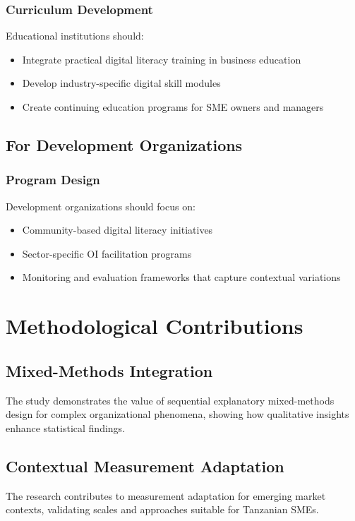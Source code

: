 \subsubsection{Curriculum Development}
Educational institutions should:
\begin{itemize}
    \item Integrate practical digital literacy training in business education
    \item Develop industry-specific digital skill modules
    \item Create continuing education programs for SME owners and managers
\end{itemize}

\subsection{For Development Organizations}

\subsubsection{Program Design}
Development organizations should focus on:
\begin{itemize}
    \item Community-based digital literacy initiatives
    \item Sector-specific OI facilitation programs
    \item Monitoring and evaluation frameworks that capture contextual variations
\end{itemize}

\section{Methodological Contributions}

\subsection{Mixed-Methods Integration}
The study demonstrates the value of sequential explanatory mixed-methods design for complex organizational phenomena, showing how qualitative insights enhance statistical findings.

\subsection{Contextual Measurement Adaptation}
The research contributes to measurement adaptation for emerging market contexts, validating scales and approaches suitable for Tanzanian SMEs.


